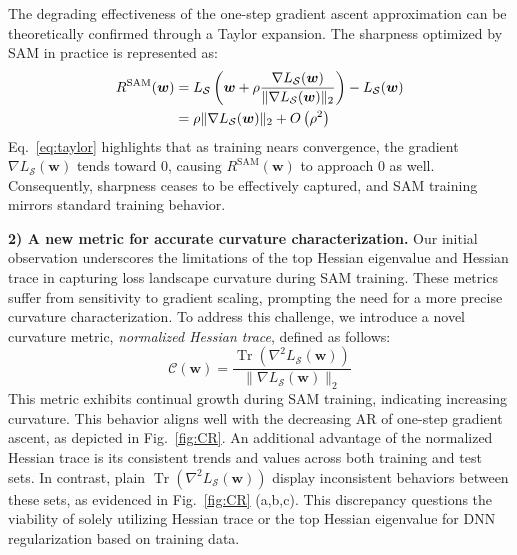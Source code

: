 \documentclass[letterpaper]{article} %
\theoremstyle{plain}
\theoremstyle{definition}
\newcommand{\fref}[1]{Fig.~\ref{#1}}
\begin{document}
The degrading effectiveness of the one-step gradient ascent approximation can be theoretically confirmed through a Taylor expansion. The sharpness optimized by SAM in practice is represented as:
\begin{align}\label{eq:taylor}
R^{\mathrm{SAM}}(\boldsymbol{w})&=L_{\mathcal{S}}\left(\boldsymbol{w}+\rho \frac{\nabla L_{\mathcal{S}}(\boldsymbol{w})}{\|\nabla L_{\mathcal{S}}(\boldsymbol{w})\|_2}\right)-L_{\mathcal{S}}(\boldsymbol{w}) \notag \\
&=\rho\|\nabla L_{\mathcal{S}}(\boldsymbol{w})\|_2 + O\left(\rho^2\right)
\end{align}
Eq.~\eqref{eq:taylor} highlights that as training nears convergence, the gradient $\nabla L_{\mathcal{S}}(\boldsymbol{w})$ tends toward $0$, causing $R^{\mathrm{SAM}}(\boldsymbol{w})$ to approach $0$ as well. Consequently, sharpness ceases to be effectively captured, and SAM training mirrors standard training behavior.


\textbf{2) A new metric for accurate curvature characterization.} 
Our initial observation underscores the limitations of the top Hessian eigenvalue and Hessian trace in capturing loss landscape curvature during SAM training. These metrics suffer from sensitivity to gradient scaling, prompting the need for a more precise curvature characterization. To address this challenge, we introduce a novel curvature metric, \emph{normalized Hessian trace}, defined as follows:
\begin{equation}\label{eq:normHtr}
\mathcal{C}(\boldsymbol{w})=\frac{\operatorname{Tr}\left(\nabla^2 L_{\mathcal{S}}\left(\boldsymbol{w}\right)\right)}{\|\nabla L_{\mathcal{S}}(\boldsymbol{w})\|_2}
\end{equation}
This metric exhibits continual growth during SAM training, indicating increasing curvature. This behavior aligns well with the decreasing AR of one-step gradient ascent, as depicted in \fref{fig:CR}. An additional advantage of the normalized Hessian trace is its consistent trends and values across both training and test sets. In contrast, plain $\operatorname{Tr}\left(\nabla^2 L_{\mathcal{S}}\left(\boldsymbol{w}\right)\right)$ display inconsistent behaviors between these sets, as evidenced in \fref{fig:CR} (a,b,c). This discrepancy questions the viability of solely utilizing Hessian trace or the top Hessian eigenvalue for DNN regularization based on training data.
\end{document}
